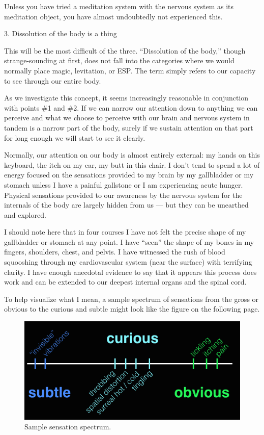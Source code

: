 \documentclass{article}
\begin{document}
Unless you have tried a meditation system with the nervous system as its meditation object, you have almost undoubtedly not experienced this.

\vspace{1cm}
\begin{center}
  \LARGE{3. Dissolution of the body is a thing}
\end{center}

This will be the most difficult of the three. ``Dissolution of the body,'' though strange-sounding at first, does not fall into the categories where we would normally place magic, levitation, or ESP. The term simply refers to our capacity to see through our entire body.

As we investigate this concept, it seems increasingly reasonable in conjunction with points \#1 and \#2. If we can narrow our attention down to anything we can perceive and what we choose to perceive with our brain and nervous system in tandem is a narrow part of the body, surely if we sustain attention on that part for long enough we will start to see it clearly.

Normally, our attention on our body is almost entirely external: my hands on this keyboard, the itch on my ear, my butt in this chair. I don't tend to spend a lot of energy focused on the sensations provided to my brain by my gallbladder or my stomach unless I have a painful gallstone or I am experiencing acute hunger. Physical sensations provided to our awareness by the nervous system for the internals of the body are largely hidden from us — but they can be unearthed and explored.

I should note here that in four courses I have not felt the precise shape of my gallbladder or stomach at any point. I have ``seen'' the shape of my bones in my fingers, shoulders, chest, and pelvis. I have witnessed the rush of blood squooshing through my cardiovascular system (near the surface) with terrifying clarity. I have enough anecdotal evidence to say that it appears this process does work and can be extended to our deepest internal organs and the spinal cord.

To help visualize what I mean, a sample spectrum of sensations from the gross or obvious to the curious and subtle might look like the figure on the following page.

\begin{figure}[h]
  \centering
  \includegraphics[width=\linewidth]{images/sensation-spectrum.jpeg}
  \caption{Sample sensation spectrum.}
  \label{fig:sensation-spectrum}
\end{figure}
\end{document}
